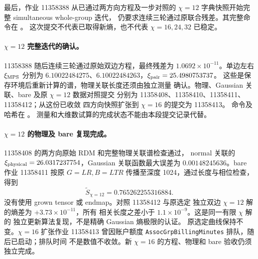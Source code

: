 最后，作业 11358388 从已通过两方向方程及一步对照的
$\chi=12$ 字典快照开始完整 simultaneous whole-group 迭代，
仍要求连续三轮通过原联合残差。其完整命令在
。
这次提交不代表已取得新熵，也不代表 $\chi=16,24,32$ 已稳定。


\paragraph{$\chi=12$ 完整迭代的确认。}
11358388 随后连续三轮通过原始双边方程，最终残差为
$1.0692\times10^{-11}$。单边左右 $\xi_{\rm MPS}$ 分别为
$6.10022484275$、$6.10022484263$，$\xi_{\rm pair}=25.4980753737$。
这些是保存环境后重新计算的谱，物理关联长度还须由独立测量
确认。物理、Gaussian 关联、bare 及原 $\chi=12$ 数据对照提交
分别为 11358408、11358410、11358411、11358412；从这份已收敛
四方向快照扩张到 $\chi=16$ 的提交为 11358413。
命令及哈希在 。
测量和大维数试算的完成状态不能由本段提交记录代替。


\paragraph{$\chi=12$ 的物理及 bare 复现完成。}
11358408 的两方向原始 RDM 和完整物理关联谱检查通过，
normal 关联的 $\xi_{\rm physical}=26.0317237754$，Gaussian
关联函数最大误差为 $0.00148245636$。bare 作业 11358411 按原
$G=LR,B=LTR$ 传播至深度 1024，通过长度与相位检查，得到
\[
 \widetilde S_{\chi=12}=0.765262255316884.
\]
没有使用 grown tensor 或 endmap。对照 11358412 与原选定
独立双边 $\chi=12$ 解的熵差为 $+3.73\times10^{-11}$，所有
相关长度之差小于 $1.1\times10^{-9}$。这是同一有限 $\chi$ 解的
独立更新算法复现，不是精确 Gaussian 熵极限的认证。
原选定曲线保持不变。$\chi=16$ 扩张作业 11358413 曾因账户额度
\texttt{AssocGrpBillingMinutes} 排队，随后已启动；排队时间
不是数值不收敛。新 $\chi=16$ 的方程、物理和 bare 验收仍须
独立完成。
